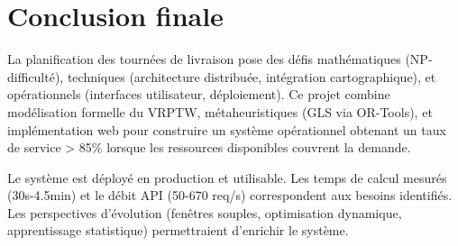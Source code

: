 \documentclass[12pt,a4paper]{report}
\begin{document}
\section*{Conclusion finale}

La planification des tournées de livraison pose des défis mathématiques (NP-difficulté), techniques (architecture distribuée, intégration cartographique), et opérationnels (interfaces utilisateur, déploiement). Ce projet combine modélisation formelle du VRPTW, métaheuristiques (GLS via OR-Tools), et implémentation web pour construire un système opérationnel obtenant un taux de service > 85\% lorsque les ressources disponibles couvrent la demande.

Le système est déployé en production et utilisable. Les temps de calcul mesurés (30s-4.5min) et le débit API (50-670 req/s) correspondent aux besoins identifiés. Les perspectives d'évolution (fenêtres souples, optimisation dynamique, apprentissage statistique) permettraient d'enrichir le système.



\end{document}
